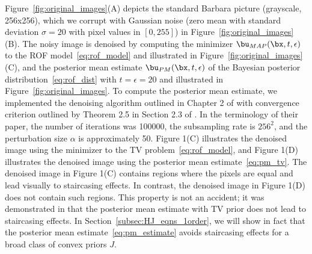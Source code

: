 Figure~\ref{fig:original_images}(A) depicts the standard Barbara picture (grayscale, 256x256), which we corrupt with Gaussian noise (zero mean with standard deviation $\sigma = 20$ with pixel values in $[0,255]$) in Figure~\ref{fig:original_images}(B). The noisy image is denoised by computing the minimizer $\bu_{MAP}(\bx,t,\epsilon)$ to the ROF model~\ref{eq:rof_model} and illustrated in Figure~\ref{fig:original_images}(C), and the posterior mean estimate $\bu_{PM}(\bx,t,\epsilon)$ of the Bayesian posterior distribution~\ref{eq:rof_dist} with $t = \epsilon = 20$ and illustrated in Figure~\ref{fig:original_images}. To compute the posterior mean estimate, we implemented the denoising algorithm outlined in Chapter 2 of \cite{louchet2008modeles} with convergence criterion outlined by Theorem 2.5 in Section 2.3 of \cite{louchet2008modeles}. In the terminology of their paper, the number of iterations was 100000, the subsampling rate is $256^2$, and the perturbation size $\alpha$ is approximately 50. Figure 1(C) illustrates the denoised image using the minimizer to the TV problem~\eqref{eq:rof_model}, and Figure 1(D) illustrates the denoised image using the posterior mean estimate~\eqref{eq:pm_tv}. The denoised image in Figure 1(C) contains regions where the pixels are equal and lead visually to staircasing effects. In contrast, the denoised image in Figure 1(D) does not contain such regions. This property is not an accident; it was demonstrated in \citet{louchet2008modeles} that the posterior mean estimate with TV prior does not lead to staircasing effects. In Section~\ref{subsec:HJ_eqns_1order}, we will show in fact that the posterior mean estimate~\ref{eq:pm_estimate} avoids staircasing effects for a broad class of convex priors $J$.

